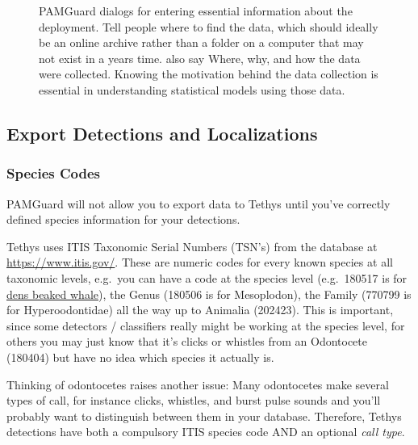 \documentclass[
]{article}
\begin{document}
\begin{figure}
\begin{minipage}{0.50\linewidth}
{}


\end{minipage}%

\caption{\label{fig-cal}PAMGuard dialogs for entering essential
information about the deployment. Tell people where to find the data,
which should ideally be an online archive rather than a folder on a
computer that may not exist in a years time. also say Where, why, and
how the data were collected. Knowing the motivation behind the data
collection is essential in understanding statistical models using those
data.}

\end{figure}%

\subsection{Export Detections and
Localizations}\label{export-detections-and-localizations}

\subsubsection{Species Codes}\label{species-codes}

PAMGuard will not allow you to export data to Tethys until you've
correctly defined species information for your detections.

Tethys uses ITIS Taxonomic Serial Numbers (TSN's) from the database at
\url{https://www.itis.gov/}. These are numeric codes for every known
species at all taxonomic levels, e.g.~you can have a code at the species
level (e.g.~180517 is for
\href{https://www.itis.gov/servlet/SingleRpt/SingleRpt?search_topic=TSN&search_value=180517\#null}{dens
beaked whale}), the Genus (180506 is for Mesoplodon), the Family (770799
is for Hyperoodontidae) all the way up to Animalia (202423). This is
important, since some detectors / classifiers really might be working at
the species level, for others you may just know that it's clicks or
whistles from an Odontocete (180404) but have no idea which species it
actually is.

Thinking of odontocetes raises another issue: Many odontocetes make
several types of call, for instance clicks, whistles, and burst pulse
sounds and you'll probably want to distinguish between them in your
database. Therefore, Tethys detections have both a compulsory ITIS
species code AND an optional \emph{call type}.
\end{document}
